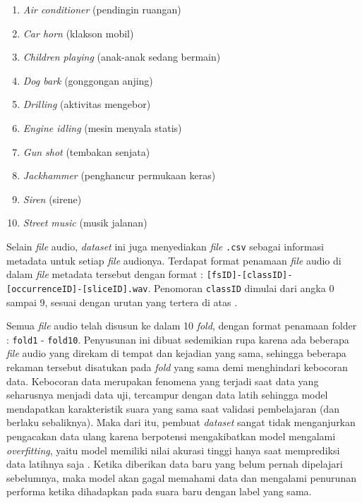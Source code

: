 \begin{enumerate}
	\item \textit{Air conditioner} (pendingin ruangan)
	\item \textit{Car horn} (klakson mobil)
	\item \textit{Children playing} (anak-anak sedang bermain)
	\item \textit{Dog bark} (gonggongan anjing)
	\item \textit{Drilling} (aktivitas mengebor)
	\item \textit{Engine idling} (mesin menyala statis)
	\item \textit{Gun shot} (tembakan senjata)
	\item \textit{Jackhammer} (penghancur permukaan keras)
	\item \textit{Siren} (sirene)
	\item \textit{Street music} (musik jalanan)
\end{enumerate}
 
Selain \textit{file} audio, \textit{dataset} ini juga menyediakan \textit{file} \texttt{.csv} sebagai informasi metadata untuk setiap \textit{file} audionya.
Terdapat format penamaan \textit{file} audio di dalam \textit{file} metadata tersebut dengan format : \texttt{[fsID]-[classID]-[occurrenceID]-[sliceID].wav}.
Penomoran \texttt{classID} dimulai dari angka 0 sampai 9, sesuai dengan urutan yang tertera di atas \cite{salamon2014dataset}. \par

Semua \textit{file} audio telah disusun ke dalam 10 \textit{fold}, dengan format penamaan folder : \texttt{fold1} - \texttt{fold10}.
Penyusunan ini dibuat sedemikian rupa karena ada beberapa \textit{file} audio yang direkam di tempat dan kejadian yang sama, sehingga beberapa rekaman tersebut disatukan pada \textit{fold} yang sama demi menghindari kebocoran data.
Kebocoran data merupakan fenomena yang terjadi saat data yang seharusnya menjadi data uji, tercampur dengan data latih sehingga model mendapatkan karakteristik suara yang sama saat validasi pembelajaran (dan berlaku sebaliknya).
Maka dari itu, pembuat \textit{dataset} sangat tidak menganjurkan pengacakan data ulang karena berpotensi mengakibatkan model mengalami \textit{overfitting}, yaitu model memiliki nilai akurasi tinggi hanya saat memprediksi data latihnya saja \cite{salamon2014dataset}.
Ketika diberikan data baru yang belum pernah dipelajari sebelumnya, maka model akan gagal memahami data dan mengalami penurunan performa ketika dihadapkan pada suara baru dengan label yang sama. \par

